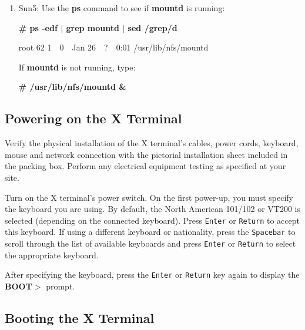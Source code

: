 \documentclass[11pt]{article}
\begin{document}
\begin {enumerate}
{\bf \# ps} {\tt -options} {\bf $|$ grep nfsd $|$ sed /grep/d}

root 62 1\ \ 0\ \ Jan 26\ \ ?\ \ 0:01 nfsd

If {\bf nfsd} is not running, type:

{\bf \# /usr/etc/nfsd 8 \&}

or for Sun5: {\bf \# /usr/lib/nfs/nfsd 8 \&}

If {\bf nfsd} is running, use the {\bf kill} command with the PID to restart
the daemon (the PID is 62 in the preceding {\bf ps} example):

{\bf \# kill -1} {\tt PID}

\item Sun5: Use the {\bf ps} command to see if {\bf mountd} is running:

{\bf \# ps -edf $|$ grep mountd $|$ sed /grep/d}

root 62 1\ \ 0\ \ Jan 26\ \ ?\ \ 0:01 /usr/lib/nfs/mountd

If {\bf mountd} is not running, type:

{\bf \# /usr/lib/nfs/mountd \&}

\end {enumerate}


\subsection {Powering on the X Terminal}

Verify the physical installation of the X terminal's cables, power cords,
keyboard, mouse and network connection with the pictorial installation sheet
included in the packing box. Perform any electrical equipment testing as
specified at your site.

Turn on the X terminal's power switch. On the first power-up, you must specify
the keyboard you are using. By default, the North American 101/102 or VT200 is
selected (depending on the connected keyboard). Press {\tt Enter} or
{\tt Return} to accept this keyboard. If using a different keyboard or
nationality, press the {\tt Spacebar} to scroll through the list of available
keyboards and press {\tt Enter} or {\tt Return} to select the appropriate
keyboard.

After specifying the keyboard, press the {\tt Enter} or {\tt Return} key again
to display the {\bf BOOT$>$} prompt.

\subsection {Booting the X Terminal}
\end{document}

